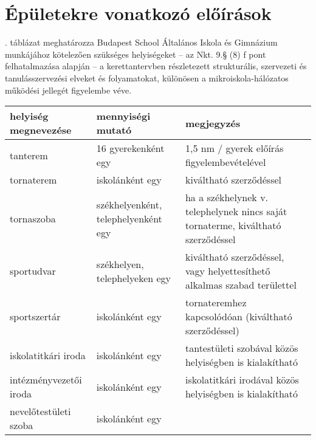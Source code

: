 \section{Épületekre vonatkozó előírások}
. táblázat meghatározza Budapest School Általános Iskola
és Gimnázium munkájához kötelezően szükséges helyiségeket -- az Nkt. 9.§ (8) f
pont felhatalmazása alapján -- a kerettantervben részletezett strukturális,
szervezeti és tanulásszervezési elveket és folyamatokat, különösen a
mikroiskola-hálózatos működési jellegét figyelembe véve.

\begin{longtable}{@{}p{4cm}|p{4cm}|p{6cm}@{}}

    \textbf{helyiség megnevezése} & \textbf{mennyiségi mutató}
                                  & \textbf{megjegyzés}
    \\ \hline
    tanterem                      & 16 gyerekenként egy                       & 1,5 nm /
    gyerek előírás figyelembevételével
    \\ \hline
    tornaterem                    & iskolánként egy                           & kiváltható
    szerződéssel
    \\ \hline
    tornaszoba                    & székhelyenként, telephelyenként egy       & ha a
    székhelynek v. telephelynek nincs saját tornaterme, kiváltható szerződéssel
    \\ \hline
    sportudvar                    & székhelyen, telephelyeken egy             & kiváltható
    szerződéssel, vagy helyettesíthető alkalmas szabad területtel
    \\ \hline
    sportszertár                  & iskolánként egy                           &
    tornateremhez kapcsolódóan (kiváltható szerződéssel)
    \\ \hline
    iskolatitkári iroda           & iskolánként egy                           &
    tantestületi szobával közös helyiségben  is kialakítható
    \\ \hline
    intézményvezetői iroda        & iskolánként egy                           &
    iskolatitkári irodával közös helyiségben is kialakítható
    \\ \hline
    nevelőtestületi szoba         & iskolánként egy                           &


\end{longtable}
